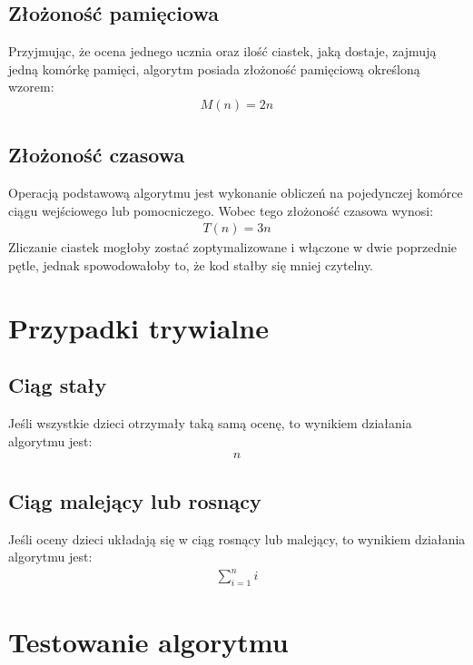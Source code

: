 \documentclass{article}
\begin{document}
	\subsection{Złożoność pamięciowa}
	Przyjmując, że ocena jednego ucznia oraz ilość ciastek, jaką dostaje, zajmują jedną komórkę pamięci, algorytm posiada złożoność pamięciową określoną wzorem:
	\begin{align*}
		M(n) = 2n
	\end{align*}

	\subsection{Złożoność czasowa}
	Operacją podstawową algorytmu jest wykonanie obliczeń na pojedynczej komórce ciągu wejściowego lub pomocniczego. Wobec tego złożoność czasowa wynosi:
	\begin{align*}
		T(n) = 3n
	\end{align*}
	Zliczanie ciastek mogłoby zostać zoptymalizowane i włączone w dwie poprzednie pętle, jednak spowodowałoby to, że kod stałby się mniej czytelny.


	\section{Przypadki trywialne}

	\subsection{Ciąg stały}

	Jeśli wszystkie dzieci otrzymały taką samą ocenę, to wynikiem działania algorytmu jest:
	\begin{align*}
		n
	\end{align*}

	\subsection{Ciąg malejący lub rosnący}

	Jeśli oceny dzieci układają się w ciąg rosnący lub malejący, to wynikiem działania algorytmu jest:
	\begin{align*}
		\displaystyle\sum_{i=1}^{n} i
	\end{align*}

	\section{Testowanie algorytmu}
\end{document}
